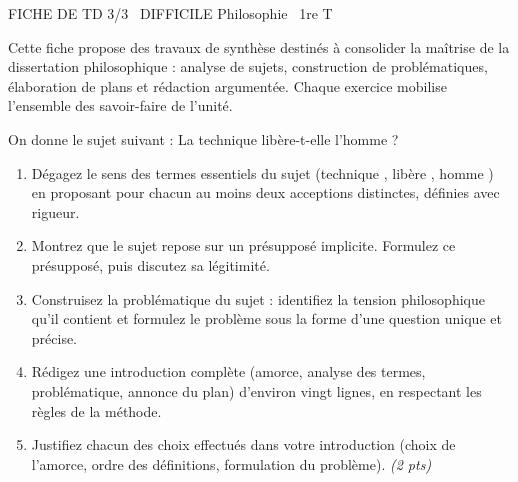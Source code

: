 \documentclass[11pt]{article}
\begin{document}
\begin{tcolorbox}[enhanced,colback=popink,colframe=popink,arc=10pt,boxrule=0pt,left=12pt,right=12pt,top=9pt,bottom=9pt]
{\color{white}\popxbold\small FICHE DE TD 3/3 \textbullet\ DIFFICILE \hfill Philosophie \textbullet\ 1re T\par}
\end{tcolorbox}
\vspace{4pt}
Cette fiche propose des travaux de synthèse destinés à consolider la maîtrise de la dissertation philosophique : analyse de sujets, construction de problématiques, élaboration de plans et rédaction argumentée. Chaque exercice mobilise l'ensemble des savoir-faire de l'unité.

\begin{exercice}
On donne le sujet suivant : \og La technique libère-t-elle l'homme ? \fg
\begin{enumerate}
\item Dégagez le sens des termes essentiels du sujet (\og technique \fg, \og libère \fg, \og homme \fg) en proposant pour chacun au moins deux acceptions distinctes, définies avec rigueur.
\item Montrez que le sujet repose sur un présupposé implicite. Formulez ce présupposé, puis discutez sa légitimité.
\item Construisez la problématique du sujet : identifiez la tension philosophique qu'il contient et formulez le problème sous la forme d'une question unique et précise.
\item Rédigez une introduction complète (amorce, analyse des termes, problématique, annonce du plan) d'environ vingt lignes, en respectant les règles de la méthode.
\item Justifiez chacun des choix effectués dans votre introduction (choix de l'amorce, ordre des définitions, formulation du problème). \emph{(2 pts)}
\end{enumerate}
\end{exercice}
\end{document}
